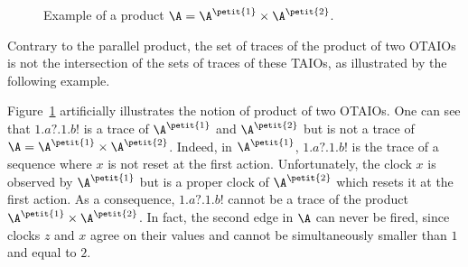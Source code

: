 \documentclass{LMCS}
\theoremstyle{plain}\newtheorem{proposition}[thm]{Proposition}
\begin{document}
\begin{center}
\begin{figure}[hbt]
{\begin{minipage}{0.52\textwidth}
\begin{center}
 \end{center}
 \end{minipage}}

 \caption{Example of a product $\A = \A^{\petit{1}} \times \A^{\petit{2}}$.}\label{ex_prod}\end{figure}   
 \end{center}

Contrary to the parallel product, 
the set of traces of the product of two OTAIOs 
is not the intersection of the sets of traces of these TAIOs,
as illustrated by the following example. 

\begin{exa}
  Figure~\ref{ex_prod} artificially illustrates the notion of product
  of two OTAIOs.  One can see that $1.a?.1.b!$ is a trace of
  $\A^{\petit{1}}$ and $\A^{\petit{2}}$ but is not a trace of $\A
    = \A^{\petit{1}} \times \A^{\petit{2}}$.  Indeed, in
  $\A^{\petit{1}}$, $1.a?.1.b!$ is the trace of a sequence where $x$
  is not reset at the first action. Unfortunately, the clock $x$ is
  observed by $\A^{\petit{1}}$ but is a proper clock of
  $\A^{\petit{2}}$ which resets it at the first action. As a
  consequence, $1.a?.1.b!$ cannot be a trace of the product
  $\A^{\petit{1}} \times \A^{\petit{2}}$. In fact, the second edge
    in $\A$ can never be fired, since clocks $z$ and $x$ agree on their values and cannot be
  simultaneously smaller than $1$ and equal to $2$.
\end{exa}
\end{document}
